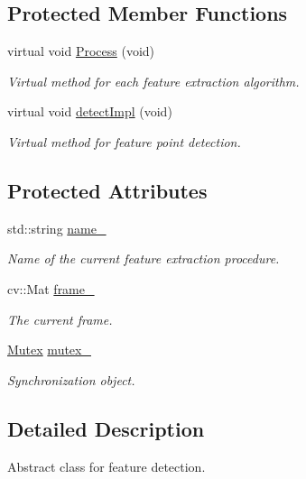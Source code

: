 \subsection*{Protected Member Functions}
\begin{DoxyCompactItemize}
\item 
virtual void \hyperlink{class_feature_ad9e3aebe506fc936c6ad18f9fc9543db}{Process} (void)
\begin{DoxyCompactList}\small\item\em Virtual method for each feature extraction algorithm. \end{DoxyCompactList}\item 
virtual void \hyperlink{class_feature_aa9b4e7ae8880145fd0eb02b4646a0a74}{detect\-Impl} (void)
\begin{DoxyCompactList}\small\item\em Virtual method for feature point detection. \end{DoxyCompactList}\end{DoxyCompactItemize}
\subsection*{Protected Attributes}
\begin{DoxyCompactItemize}
\item 
std\-::string \hyperlink{class_feature_a46e9fc1f327aaafb10de2c0425d311aa}{name\-\_\-}
\begin{DoxyCompactList}\small\item\em Name of the current feature extraction procedure. \end{DoxyCompactList}\item 
cv\-::\-Mat \hyperlink{class_feature_aa805e6fee8eeec2061feabe29430f0df}{frame\-\_\-}
\begin{DoxyCompactList}\small\item\em The current frame. \end{DoxyCompactList}\item 
\hyperlink{class_mutex}{Mutex} \hyperlink{class_feature_a08499ba9b2c77ef9a29f97d6a8f66006}{mutex\-\_\-}
\begin{DoxyCompactList}\small\item\em Synchronization object. \end{DoxyCompactList}\end{DoxyCompactItemize}


\subsection{Detailed Description}
Abstract class for feature detection. 

